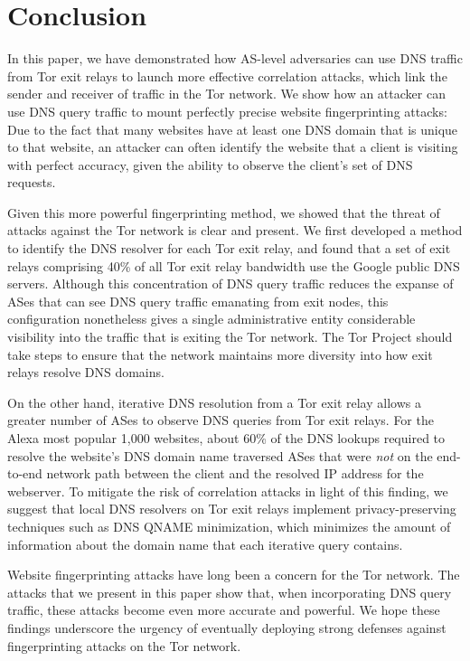 \section{Conclusion}
\label{sec:conclusion}

In this paper, we have demonstrated how AS-level adversaries can use DNS
traffic from Tor exit relays to launch more effective correlation
attacks, which link the sender and receiver of traffic in the Tor
network.  We show how an attacker can use DNS query traffic to mount
perfectly precise website fingerprinting attacks: Due to the fact that
many websites have at least one DNS domain that is unique to that
website, an attacker can often identify the website that a client is
visiting with perfect accuracy, given the ability to observe the
client's set of DNS requests.

Given this more powerful fingerprinting method, we showed that the
threat of \name attacks against the Tor network is clear and present. We
first developed a method to identify the DNS resolver for each Tor exit relay,
and found that a set of exit relays comprising 40\% of all Tor exit
relay bandwidth use the Google public DNS servers. Although this
concentration of DNS query traffic reduces the expanse of ASes that can
see DNS query traffic emanating from exit nodes, this configuration
nonetheless gives a single administrative entity considerable visibility
into the traffic that is exiting the Tor network. The Tor Project should
take steps to ensure that the network maintains more diversity into how
exit relays resolve DNS domains.

On the other hand, iterative DNS resolution from a Tor exit relay allows
a greater number of ASes to observe DNS queries from Tor exit relays.
For the Alexa most popular 1,000 websites, about 60\% of the DNS lookups
required to resolve the website's DNS domain name traversed ASes that
were {\em not} on the end-to-end network path between the client and the
resolved IP address for the webserver.  To mitigate the risk of
correlation attacks in light of this finding, we suggest that local DNS
resolvers on Tor exit relays implement privacy-preserving techniques
such as DNS QNAME minimization, which minimizes the amount of
information about the domain name that each iterative query contains.

Website fingerprinting attacks have long been a concern for the Tor
network. The attacks that we present in this paper show that, when
incorporating DNS query traffic, these attacks become even more accurate
and powerful. We hope these findings underscore the urgency of
eventually deploying strong defenses against fingerprinting attacks on
the Tor network. 
